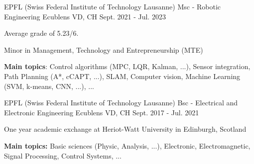 

\begin{cventries}

  \cventry
    {EPFL (Swiss Federal Institute of Technology Lausanne)} %
    {Msc - Robotic Engineering} %
    {Ecublens VD, CH} %
    {Sept. 2021 - Jul. 2023} %
    {
      \begin{cvitems} %
        \item {Average grade of 5.23/6.}
        \item Minor in Management, Technology and Entrepreneurship (MTE)
        \item {\textbf{Main topics}: Control algorithms (MPC, LQR, Kalman, ...), Sensor integration, Path Planning (A*, cCAPT, ...), SLAM, Computer vision, Machine Learning (SVM, k-means, CNN, ...), ...}
      \end{cvitems}
    }

  \cventry
    {EPFL (Swiss Federal Institute of Technology Lausanne)} %
    {Bsc - Electrical and Electronic Engineering} %
    {Ecublens VD, CH} %
    {Sept. 2017 - Jul. 2021} %
    {
      \begin{cvitems} %
        \item {One year academic exchange at Heriot-Watt University in Edinburgh, Scotland}
        \item {\textbf{Main topics:} Basic sciences (Physic, Analysis, ...), Electronic, Electromagnetic, Signal Processing, Control Systems, ...}
      \end{cvitems}
    }

\end{cventries}
